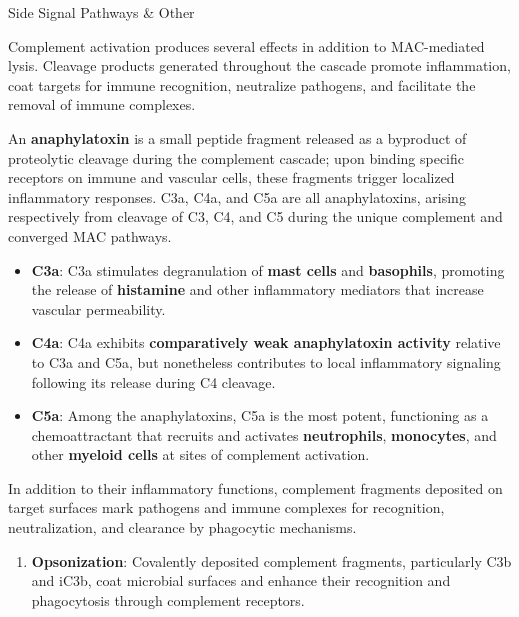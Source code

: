     \begin{core}[label=core:side_pathways]{Side Signal Pathways \& Other}

      Complement activation produces several effects in addition to MAC-mediated lysis. Cleavage products generated throughout the cascade promote inflammation, coat targets for immune recognition, neutralize pathogens, and facilitate the removal of immune complexes.

      An \textbf{anaphylatoxin} is a small peptide fragment released as a byproduct of proteolytic cleavage during the complement cascade; upon binding specific receptors on immune and vascular cells, these fragments trigger localized inflammatory responses. C3a, C4a, and C5a are all anaphylatoxins, arising respectively from cleavage of C3, C4, and C5 during the unique complement and converged MAC pathways.

      \begin{itemize}

        \item \textbf{C3a}: C3a stimulates degranulation of \textbf{mast cells} and \textbf{basophils}, promoting the release of \textbf{histamine} and other inflammatory mediators that increase vascular permeability.
          
        \item \textbf{C4a}: C4a exhibits \textbf{comparatively weak anaphylatoxin activity} relative to C3a and C5a, but nonetheless contributes to local inflammatory signaling following its release during C4 cleavage.

        \item \textbf{C5a}: Among the anaphylatoxins, C5a is the most potent, functioning as a chemoattractant that recruits and activates \textbf{neutrophils}, \textbf{monocytes}, and other \textbf{myeloid cells} at sites of complement activation.

      \end{itemize}

      In addition to their inflammatory functions, complement fragments deposited on target surfaces mark pathogens and immune complexes for recognition, neutralization, and clearance by phagocytic mechanisms.

      \begin{enumerate}

        \item \textbf{Opsonization}: Covalently deposited complement fragments, particularly C3b and iC3b, coat microbial surfaces and enhance their recognition and phagocytosis through complement receptors.


\end{enumerate}
\end{core}
